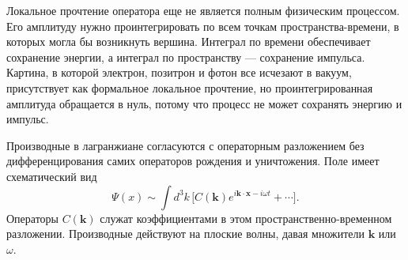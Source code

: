Локальное прочтение оператора еще не является полным физическим процессом. Его амплитуду нужно проинтегрировать по всем точкам пространства-времени, в которых могла бы возникнуть вершина. Интеграл по времени обеспечивает сохранение энергии, а интеграл по пространству — сохранение импульса. Картина, в которой электрон, позитрон и фотон все исчезают в вакуум, присутствует как формальное локальное прочтение, но проинтегрированная амплитуда обращается в нуль, потому что процесс не может сохранять энергию и импульс.

\begin{classroomqa}
\end{classroomqa}

\begin{classroomqa}
\end{classroomqa}

Производные в лагранжиане согласуются с операторным разложением без дифференцирования самих операторов рождения и уничтожения. Поле имеет схематический вид
\begin{equation}
\Psi(x)
\sim
\int d^3k\,
\bigl[
C(\mathbf k)e^{i\mathbf k\cdot\mathbf x-i\omega t}
+\cdots
\bigr].
\end{equation}
Операторы \(C(\mathbf k)\) служат коэффициентами в этом пространственно-временном разложении. Производные действуют на плоские волны, давая множители \(\mathbf k\) или \(\omega\).

\begin{classroomqa}
\end{classroomqa}

